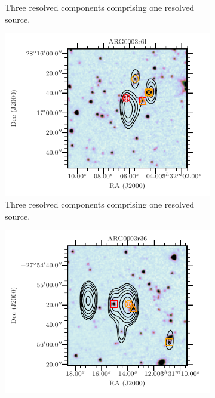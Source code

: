 \begin{figure}
\begin{subfigure}{0.45\textwidth}
            \caption{Three resolved components comprising one resolved source.}
        \end{subfigure}
        \begin{subfigure}{0.45\textwidth}
            \includegraphics[width=\textwidth]{atlas-images/examples_all/example_sorted_4_264.pdf}
            \caption{Three resolved components comprising one resolved source.}
        \end{subfigure}
        \begin{subfigure}{0.45\textwidth}
            \includegraphics[width=\textwidth]{atlas-images/examples_all/example_sorted_5_207.pdf}

\end{subfigure}
\end{figure}
